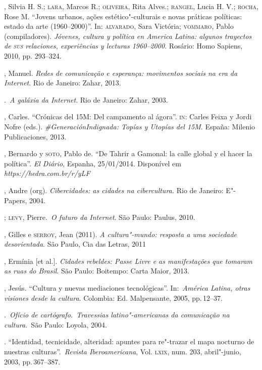 \begin{bibliohedra}
, Silvia H. S.; \textsc{lara}, Marcos R.; \textsc{oliveira}, Rita Alves.; \textsc{rangel},
Lucia H. V.; \textsc{rocha}, Rose M. ``Jovens urbanos, ações estético"-culturais e
novas práticas políticas: estado da arte (1960--2000)''. In: \textsc{alvarado},
Sara Victória; \textsc{vommaro}, Pablo (compiladores). \emph{Jóvenes, cultura y
política en America Latina: algunos trayectos de \textsc{sus} relaciones,
experiências y lecturas 1960--2000}. Rosário: Homo Sapiens, 2010, pp.
293--324.

, Manuel. \emph{Redes de comunicação e esperança: movimentos
sociais na era da Internet}. Rio de Janeiro: Zahar, 2013.

\titidem.~\emph{A galáxia da Internet}. Rio de
Janeiro: Zahar, 2003.

, Carles. ``Crónicas del 15M: Del campamento al ágora''. \textsc{in}: Carles
Feixa y Jordi Nofre (eds.). \emph{\#GeneraciónIndignada: Topías y
Utopías del 15M}. España: Milenio Publicaciones, 2013.

, Bernardo y \textsc{soto}, Pablo de. ``De Tahrir a Gamonal: la calle
global y el hacer la política''. \emph{El Diário}, Espanha, 25/01/2014.
Disponível em
\emph{https://hedra.com.br/r/yLF}

, Andre (org). \emph{Cibercidades: as cidades na cibercultura.} Rio
de Janeiro: E"-Papers, 2004.

\titidem; \textsc{levy}, Pierre.~\emph{O futuro da Internet}. São Paulo:
Paulus, 2010.

, Gilles e \textsc{serroy}, Jean (2011). \emph{A cultura"-mundo:
resposta a uma sociedade desorientada}. São Paulo, Cia das Letras, 2011

, Ermínia {[}et al.{]}. \emph{Cidades rebeldes: Passe Livre e as
manifestações que tomaram as ruas do Brasil}. São Paulo: Boitempo: Carta
Maior, 2013.

, Jesús. ``Cultura y nuevas mediaciones tecnológicas''.
In:~\emph{América Latina, otras visiones desde la cultura}. Colombia:
Ed. Malpensante, 2005, pp.\,12--37.

\titidem.~\emph{Ofício de
cartógrafo.~Travessias latino"-americanas da comunicação na cultura.}~São
Paulo: Loyola, 2004.

\titidem. ``Identidad, tecnicidade,
alteridad: apuntes para re"-trazar el mapa nocturno de nuestras
culturas''.~\emph{Revista Iberoamericana}, Vol. \textsc{lxix}, num. 203,
abril"-junio, 2003, pp.\,367--387.


\end{bibliohedra}
